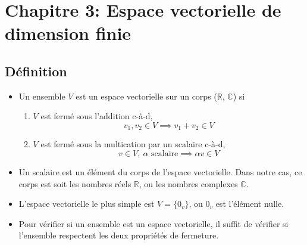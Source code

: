 \section*{Chapitre 3: Espace vectorielle de dimension finie}

\subsection*{Définition}
\begin{itemize}
    \item[] Un ensemble $V$ est un espace vectorielle sur un corps ($\mathbb{R}$, $\mathbb{C}$)
          si \begin{enumerate}[1)]
              \item $V$ est fermé sous l'addition c-à-d, \begin{equation*}
                        v_1, v_2 \in V \implies v_1 + v_2 \in V
                    \end{equation*}
              \item $V$ est fermé sous la multication par un scalaire c-à-d, \begin{equation*}
                        v \in V, \ \alpha \text{ scalaire} \implies \alpha v \in V
                    \end{equation*}
          \end{enumerate}
    \item[] Un scalaire est un élément du corps de l'espace vectorielle. Dans notre cas, ce corps
          est soit les nombres réels $\mathbb{R}$, ou les nombres complexes $\mathbb{C}$.
    \item[] L'espace vectorielle le plus simple est $V = \{ 0_v \}$, ou $0_v$ est
          l'élément nulle.
    \item[] Pour vérifier si un ensemble est un espace vectorielle, il suffit
          de vérifier si l'ensemble respectent les deux propriétés de fermeture.
\end{itemize}

